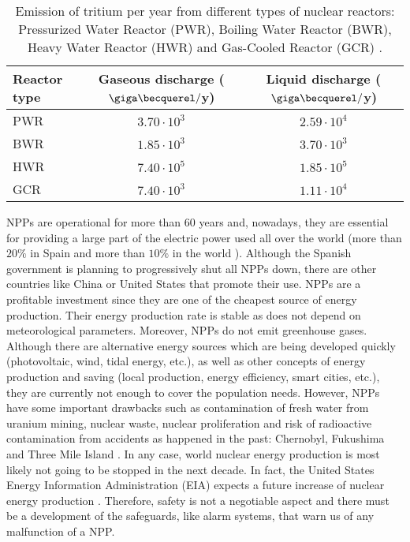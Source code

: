 \begin{table}[htbp]
\centering{}%
\begin{tabular}{lcc}
\toprule 
Reactor type & Gaseous discharge ($\giga\becquerel/$y) & Liquid discharge ($\giga\becquerel/$y)\tabularnewline
\midrule
\midrule 
PWR & $3.70\cdot 10^{3}$ & $2.59\cdot 10^{4}$ \tabularnewline
BWR & $1.85\cdot 10^{3}$ & $3.70\cdot 10^{3}$ \tabularnewline
HWR & $7.40\cdot 10^{5}$ & $1.85\cdot 10^{5}$ \tabularnewline
GCR & $7.40\cdot 10^{3}$ & $1.11\cdot 10^{4}$ \tabularnewline
\bottomrule
\end{tabular}
\caption{Emission of tritium per year from different types of nuclear reactors: Pressurized Water Reactor (PWR), Boiling Water Reactor (BWR), Heavy Water Reactor (HWR) and Gas-Cooled Reactor (GCR) \cite{CommonEmissionTritium}.}
\label{tab:TritiumEmisionsNPPs}
\end{table}

NPPs are operational for more than 60 years and, nowadays, they are essential for providing a large part of the electric power used all over the world (more than $20\%$ in Spain \cite{PercentageEnergySpain} and more than $10\%$ in the world \cite{PercentageEnergyWorld}). Although the Spanish government is planning to progressively shut all NPPs down, there are other countries like China \cite{60ReactorsChina} or United States \cite{35MillionsUSA} that promote their use. NPPs are a profitable investment since they are one of the cheapest source of energy production. Their energy production rate is stable as does not depend on meteorological parameters. Moreover, NPPs do not emit greenhouse gases. Although there are alternative energy sources which are being developed quickly (photovoltaic, wind, tidal energy, etc.), as well as other concepts of energy production and saving (local production, energy efficiency, smart cities, etc.), they are currently not enough to cover the population needs. However, NPPs have some important drawbacks such as contamination of fresh water from uranium mining, nuclear waste, nuclear proliferation and risk of radioactive contamination from accidents as happened in the past: Chernobyl, Fukushima and Three Mile Island \cite{ThreeMileIsland}. In any case, world nuclear energy production is most likely not going to be stopped in the next decade. In fact, the United States Energy Information Administration (EIA) expects a future increase of nuclear energy production \cite{EIAOutlook}. Therefore, safety is not a negotiable aspect and there must be a development of the safeguards, like alarm systems, that warn us of any malfunction of a NPP. 

